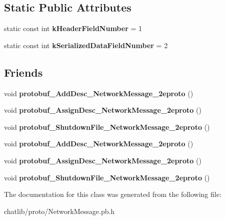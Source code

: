 \subsection*{Static Public Attributes}
\begin{DoxyCompactItemize}
\item 
\hypertarget{classSimpleChat_1_1NetworkMessage_a24821b9d09b0dc666322a5615092a7d6}{static const int {\bfseries k\-Header\-Field\-Number} = 1}\label{classSimpleChat_1_1NetworkMessage_a24821b9d09b0dc666322a5615092a7d6}

\item 
\hypertarget{classSimpleChat_1_1NetworkMessage_ac3bc296196533f7417d7be0b6977d2d4}{static const int {\bfseries k\-Serialized\-Data\-Field\-Number} = 2}\label{classSimpleChat_1_1NetworkMessage_ac3bc296196533f7417d7be0b6977d2d4}

\end{DoxyCompactItemize}
\subsection*{Friends}
\begin{DoxyCompactItemize}
\item 
\hypertarget{classSimpleChat_1_1NetworkMessage_a3486afd4adb1bba7588d52e4aabbca06}{void {\bfseries protobuf\-\_\-\-Add\-Desc\-\_\-\-Network\-Message\-\_\-2eproto} ()}\label{classSimpleChat_1_1NetworkMessage_a3486afd4adb1bba7588d52e4aabbca06}

\item 
\hypertarget{classSimpleChat_1_1NetworkMessage_af845200205064a98818e47c69988e43b}{void {\bfseries protobuf\-\_\-\-Assign\-Desc\-\_\-\-Network\-Message\-\_\-2eproto} ()}\label{classSimpleChat_1_1NetworkMessage_af845200205064a98818e47c69988e43b}

\item 
\hypertarget{classSimpleChat_1_1NetworkMessage_a5dd630836c26acd95825919f5d81def4}{void {\bfseries protobuf\-\_\-\-Shutdown\-File\-\_\-\-Network\-Message\-\_\-2eproto} ()}\label{classSimpleChat_1_1NetworkMessage_a5dd630836c26acd95825919f5d81def4}

\item 
\hypertarget{classSimpleChat_1_1NetworkMessage_a3486afd4adb1bba7588d52e4aabbca06}{void {\bfseries protobuf\-\_\-\-Add\-Desc\-\_\-\-Network\-Message\-\_\-2eproto} ()}\label{classSimpleChat_1_1NetworkMessage_a3486afd4adb1bba7588d52e4aabbca06}

\item 
\hypertarget{classSimpleChat_1_1NetworkMessage_af845200205064a98818e47c69988e43b}{void {\bfseries protobuf\-\_\-\-Assign\-Desc\-\_\-\-Network\-Message\-\_\-2eproto} ()}\label{classSimpleChat_1_1NetworkMessage_af845200205064a98818e47c69988e43b}

\item 
\hypertarget{classSimpleChat_1_1NetworkMessage_a5dd630836c26acd95825919f5d81def4}{void {\bfseries protobuf\-\_\-\-Shutdown\-File\-\_\-\-Network\-Message\-\_\-2eproto} ()}\label{classSimpleChat_1_1NetworkMessage_a5dd630836c26acd95825919f5d81def4}

\end{DoxyCompactItemize}


The documentation for this class was generated from the following file\-:\begin{DoxyCompactItemize}
\item 
chatlib/proto/Network\-Message.\-pb.\-h\end{DoxyCompactItemize}
